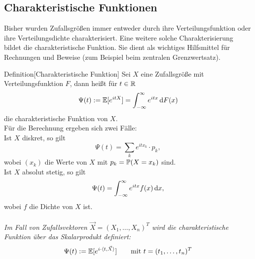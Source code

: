 



\subsection{Charakteristische Funktionen}

Bisher wurden Zufallsgrößen immer entweder durch ihre Verteilungsfunktion oder ihre Verteilungsdichte charakterisiert. 
Eine weitere solche Charakterisierung bildet die charakteristische Funktion. Sie dient als wichtiges Hilfsmittel 
für Rechnungen und Beweise (zum Beispiel beim zentralen Grenzwertsatz).

\begin{colbox}{Definition}[Charakteristische Funktion]
    Sei $X$ eine Zufallsgröße mit Verteilungsfunktion $F$, dann heißt für $t\in\R$ 
    \[
        \Psi(t) := \E[e^{itX}] = \int_{-\infty}^{\infty} e^{itx} \diff F(x)
    \]
    die charakteristische Funktion von $X$. \\ 
    
    Für die Berechnung ergeben sich zwei Fälle: \\
    Ist $X$ diskret, so gilt 
    \[
        \Psi(t) = \sum_{k} e^{itx_k}\cdot p_k, 
    \]
    wobei $(x_k)$ die Werte von $X$ mit $p_k = \P(X=x_k)$  sind.\\
    Ist $X$ absolut stetig, so gilt 
    \[
        \Psi(t) = \int_{-\infty}^{\infty}e^{itx}f(x) \diff x,
    \]
    wobei $f$ die Dichte von $X$ ist. \\ \\
    \textit{Im Fall von Zufallsvektoren $\vec{X}=(X_1,\dots,X_n)^T$ wird die charakteristische Funktion über das 
    Skalarprodukt definiert:}
    \[
    \Psi(t) := \E[e^{i\cdot\langle t,\vec{X}\rangle}] \qquad \text{mit } t = (t_1,\dots,t_n)^T
    \]
\end{colbox}

